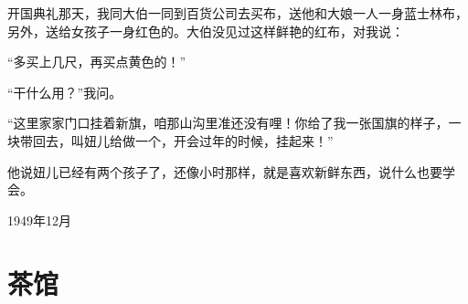 \documentclass[12pt,UTF-8,openany]{ctexbook}
\begin{document}
\begin{normalsize}
    开国典礼那天，我同大伯一同到百货公司去买布，送他和大娘一人一身蓝士林布，另外，送给女孩子一身红色的。大伯没见过这样鲜艳的红布，对我说：
    
    “多买上几尺，再买点黄色的！”
    
    “干什么用？”我问。
    
    “这里家家门口挂着新旗，咱那山沟里准还没有哩！你给了我一张国旗的样子，一块带回去，叫妞儿给做一个，开会过年的时候，挂起来！”
    
    他说妞儿已经有两个孩子了，还像小时那样，就是喜欢新鲜东西，说什么也要学会。
    
    \hfill 1949年12月
    
\end{normalsize}



\chapter{茶馆}
\end{document}
